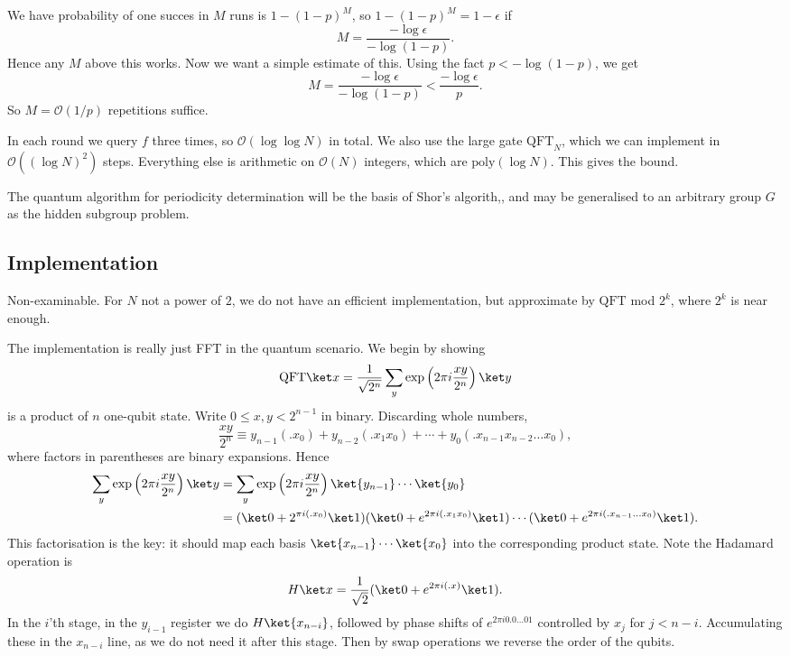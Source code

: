 \documentclass[12pt]{article}
\begin{document}
\begin{proofbox}
	We have probability of one succes in $M$ runs is $1 - (1 - p)^M$, so $1 - (1 - p)^M = 1 - \epsilon$ if
	\[
	M = \frac{- \log \epsilon}{- \log(1 - p)}.
	\]
	Hence any $M$ above this works. Now we want a simple estimate of this. Using the fact $p < - \log(1 - p)$, we get
	\[
	M = \frac{- \log \epsilon}{- \log(1 - p)} < \frac{- \log \epsilon}{p}.
	\]
	So $M = \mathcal{O}(1/p)$ repetitions suffice.
\end{proofbox}

In each round we query $f$ three times, so $\mathcal{O}(\log \log N)$ in total. We also use the large gate $\mathrm{QFT}_N$, which we can implement in $\mathcal{O}((\log N)^2)$ steps. Everything else is arithmetic on $\mathcal{O}(N)$ integers, which are $\mathrm{poly}(\log N)$. This gives the bound.

The quantum algorithm for periodicity determination will be the basis of Shor's algorith,, and may be generalised to an arbitrary group $G$ as the hidden subgroup problem.

\subsection{Implementation}
\label{sub:qft_imp}

Non-examinable. For $N$ not a power of $2$, we do not have an efficient implementation, but approximate by $\mathrm{QFT}$ mod $2^k$, where $2^k$ is near enough.

The implementation is really just FFT in the quantum scenario. We begin by showing
\[
	\mathrm{QFT}\ket x = \frac{1}{\sqrt{2^n}} \sum_y \exp \left( 2 \pi i \frac{xy}{2^n} \right) \ket y
\]
is a product of $n$ one-qubit state. Write $0 \leq x, y < 2^{n-1}$ in binary. Discarding whole numbers,
\[
\frac{xy}{2^n} \equiv y_{n-1}(.x_0) + y_{n-2}(.x_1x_0) + \cdots + y_0(.x_{n-1}x_{n-2}\ldots x_0),
\]
where factors in parentheses are binary expansions. Hence
\begin{align*}
\sum_y \exp \left( 2 \pi i \frac{xy}{2^n} \right) \ket y &= \sum_y \exp \left( 2 \pi i \frac{xy}{2^n} \right) \ket{y_{n-1}} \cdots \ket{y_0} \\
							 &= (\ket 0 + 2^{\pi i(.x_0)} \ket 1)(\ket 0 + e^{2 \pi i(.x_1x_0)} \ket 1 ) \cdots (\ket 0 + e^{2 \pi i(.x_{n-1} \ldots x_0)} \ket 1).
\end{align*}
This factorisation is the key: it should map each basis $\ket{x_{n-1}} \cdots \ket{x_0}$ into the corresponding product state. Note the Hadamard operation is
\[
H \ket x = \frac{1}{\sqrt 2} (\ket 0 + e^{2 \pi i(.x)} \ket 1).
\]
In the $i$'th stage, in the $y_{i-1}$ register we do $H \ket{x_{n - i}}$, followed by phase shifts of $e^{2 \pi i0.0\ldots 01}$ controlled by $x_j$ for $j < n-i$. Accumulating these in the $x_{n-i}$ line, as we do not need it after this stage. Then by swap operations we reverse the order of the qubits.
\end{document}
